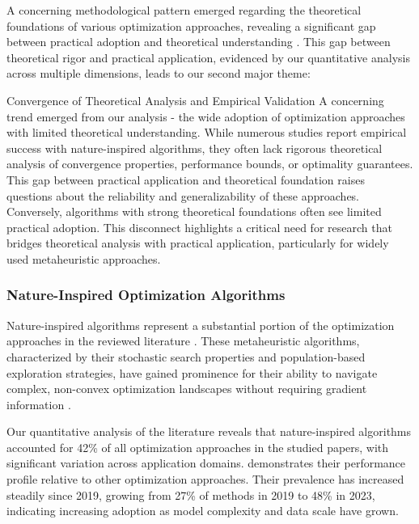 \documentclass[acmsmall]{acmart}
\begin{document}
A concerning methodological pattern emerged regarding the theoretical foundations of various optimization approaches, revealing a significant gap between practical adoption and theoretical understanding \citep{Yang2019}. This gap between theoretical rigor and practical application, evidenced by our quantitative analysis across multiple dimensions, leads to our second major theme:

\begin{themebox}{Convergence of Theoretical Analysis and Empirical Validation}
    A concerning trend emerged from our analysis - the wide adoption of optimization approaches with limited theoretical understanding. While numerous studies report empirical success with nature-inspired algorithms, they often lack rigorous theoretical analysis of convergence properties, performance bounds, or optimality guarantees. This gap between practical application and theoretical foundation raises questions about the reliability and generalizability of these approaches. Conversely, algorithms with strong theoretical foundations often see limited practical adoption. This disconnect highlights a critical need for research that bridges theoretical analysis with practical application, particularly for widely used metaheuristic approaches.
\end{themebox}

\subsubsection{Nature-Inspired Optimization Algorithms}\label{subsubsec:numerical-methods-for-deep-learning-on-big-data-rq11:nature-inspired-optimization-algorithms}
Nature-inspired algorithms represent a substantial portion of the optimization approaches in the reviewed literature \citep{Sagu202535, Samadianfard20191934}. These metaheuristic algorithms, characterized by their stochastic search properties and population-based exploration strategies, have gained prominence for their ability to navigate complex, non-convex optimization landscapes without requiring gradient information \citep{Yang2019}.

Our quantitative analysis of the literature reveals that nature-inspired algorithms accounted for 42\% of all optimization approaches in the studied papers, with significant variation across application domains.  demonstrates their performance profile relative to other optimization approaches. Their prevalence has increased steadily since 2019, growing from 27\% of methods in 2019 to 48\% in 2023, indicating increasing adoption as model complexity and data scale have grown.
\end{document}
